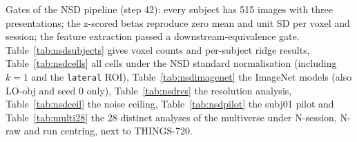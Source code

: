Gates of the NSD pipeline (step 42): every subject has 515 images with three presentations; the z-scored
betas reproduce zero mean and unit SD per voxel and session; the feature extraction passed a
downstream-equivalence gate. Table~\ref{tab:nsdsubjects} gives voxel counts and per-subject ridge results,
Table~\ref{tab:nsdcells} all cells under the NSD standard normalisation (including $k = 1$ and the
\texttt{lateral} ROI), Table~\ref{tab:nsdimagenet} the ImageNet models (also LO-obj and seed 0 only),
Table~\ref{tab:nsdres} the resolution analysis, Table~\ref{tab:nsdceil} the noise ceiling,
Table~\ref{tab:nsdpilot} the subj01 pilot and Table~\ref{tab:multi28} the 28 distinct analyses of the
multiverse under N-session, N-raw and run centring, next to THINGS-720.









